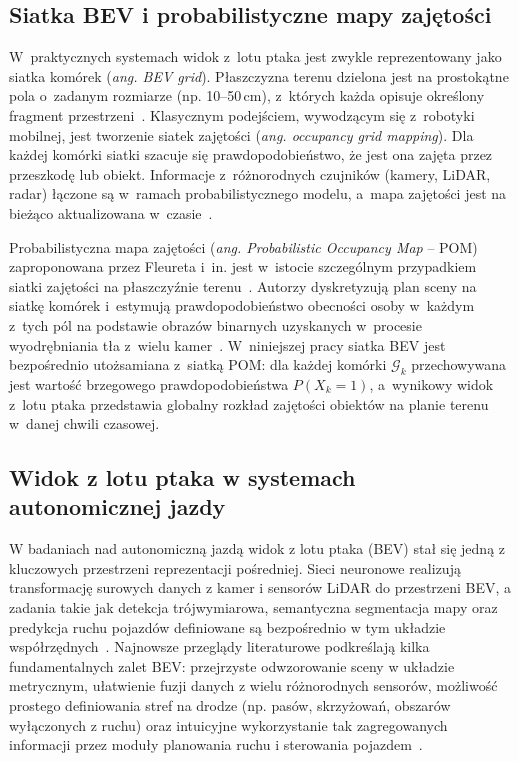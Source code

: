 \subsection{Siatka BEV i probabilistyczne mapy zajętości}

W~praktycznych systemach widok z~lotu ptaka jest zwykle reprezentowany jako siatka komórek
(\textit{ang. BEV grid}). Płaszczyzna terenu dzielona jest na prostokątne pola o~zadanym rozmiarze
(np. 10--50\,cm), z~których każda opisuje określony fragment
przestrzeni~\cite{mandeljc2013tracking}. Klasycznym podejściem, wywodzącym się z~robotyki mobilnej,
jest tworzenie siatek zajętości (\textit{ang. occupancy grid mapping}). Dla każdej komórki siatki
szacuje się prawdopodobieństwo, że jest ona zajęta przez przeszkodę lub obiekt. Informacje
z~różnorodnych czujników (kamery, LiDAR, radar) łączone są w~ramach probabilistycznego modelu,
a~mapa zajętości jest na bieżąco aktualizowana w~czasie~\cite{mandeljc2013tracking}.

Probabilistyczna mapa zajętości (\textit{ang. Probabilistic Occupancy Map} -- POM) zaproponowana
przez Fleureta i~in. jest w~istocie szczególnym przypadkiem siatki zajętości na płaszczyźnie
terenu~\cite{mandeljc2013tracking}. Autorzy dyskretyzują plan sceny na siatkę komórek i~estymują
prawdopodobieństwo obecności osoby w~każdym z~tych pól na podstawie obrazów binarnych uzyskanych
w~procesie wyodrębniania tła z~wielu kamer~\cite{fleuret2008}. W~niniejszej pracy siatka BEV jest
bezpośrednio utożsamiana z~siatką POM: dla każdej komórki $\mathcal{G}_k$ przechowywana jest
wartość brzegowego prawdopodobieństwa $P(X_k = 1)$, a~wynikowy widok z~lotu ptaka przedstawia
globalny rozkład zajętości obiektów na planie terenu w~danej chwili czasowej.

\subsection{Widok z lotu ptaka w systemach autonomicznej jazdy}

W badaniach nad autonomiczną jazdą widok z lotu ptaka (BEV) stał się jedną z kluczowych przestrzeni
reprezentacji pośredniej. Sieci neuronowe realizują transformację surowych danych z kamer i
sensorów LiDAR do przestrzeni BEV, a zadania takie jak detekcja trójwymiarowa, semantyczna
segmentacja mapy oraz predykcja ruchu pojazdów definiowane są bezpośrednio w tym układzie
współrzędnych~\cite{li2023, zhao2024}. Najnowsze przeglądy literaturowe podkreślają kilka
fundamentalnych zalet BEV: przejrzyste odwzorowanie sceny w układzie metrycznym, ułatwienie fuzji
danych z wielu różnorodnych sensorów, możliwość prostego definiowania stref na drodze (np. pasów,
skrzyżowań, obszarów wyłączonych z ruchu) oraz intuicyjne wykorzystanie tak zagregowanych
informacji przez moduły planowania ruchu i sterowania pojazdem~\cite{li2023, zhao2024}.

